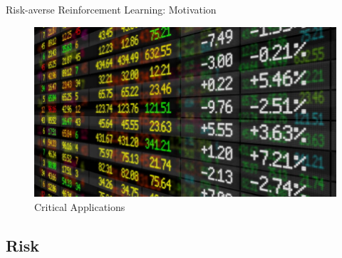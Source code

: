 \documentclass{beamer}
\begin{document}
\begin{frame}{Risk-averse Reinforcement Learning: Motivation}
\begin{figure}
    \begin{minipage}{0.33\textwidth}
        \centering
        \includegraphics[width=\linewidth]{gfx/stock_market.jpg}
        \caption{\footnotesize Critical Applications}
    \end{minipage}
\end{figure}
\vspace{-0.5cm}


\end{frame}


\subsection{Risk}

%
%
%
%
%
%
\end{document}
